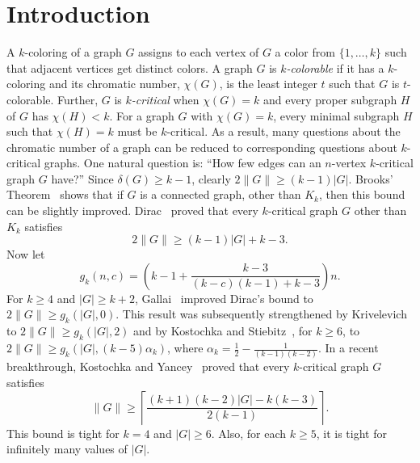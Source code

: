\documentclass[12pt]{article}
\theoremstyle{plain}
\theoremstyle{definition}
\theoremstyle{remark}
\newcommand{\ceil}[1]{\left\lceil#1\right\rceil}
\begin{document}
\section{Introduction}
A $k$-coloring of a graph $G$ assigns to each vertex of $G$ a color from
$\{1,\ldots,k\}$ such that adjacent vertices get distinct colors.  A graph $G$ is
\emph{$k$-colorable} if it has a $k$-coloring and its chromatic number,
$\chi(G)$, is the least integer $t$ such that $G$ is $t$-colorable.  
Further, $G$ is \emph{$k$-critical} when $\chi(G)=k$ and every proper subgraph
$H$ of $G$ has $\chi(H)<k$.  For a graph $G$ with $\chi(G)=k$, every minimal
subgraph $H$ such that $\chi(H)=k$ must be $k$-critical.  As a result, many
questions about the chromatic number of a graph can be reduced to corresponding
questions about $k$-critical graphs.  One natural question is: ``How few edges can
an $n$-vertex $k$-critical graph $G$ have?''  Since $\delta(G)\ge k-1$, clearly
$2\|G\| \ge (k-1)|G|$.  Brooks' Theorem~\cite{brooks1941coloring} shows that if
$G$ is a connected graph, other than $K_k$, then this bound can be slightly
improved.  Dirac~\cite{dirac1957theorem} proved that every $k$-critical graph
$G$ other than $K_k$ satisfies 
$$
2\|G\| \ge (k-1)|G|+k-3.
$$
Now let 
$$
g_k(n,c) = \left(k-1 + \frac{k-3}{(k-c)(k-1)+k-3}\right)n.
$$
For $k\ge 4$ and $|G|\ge k+2$, Gallai~\cite{gallai1963kritische} improved
Dirac's bound to $2\|G\| \ge g_k(|G|,0)$.  This result was subsequently
strengthened by Krivelevich~\cite{krivelevich1997minimal} to $2\|G\|\ge
g_k(|G|,2)$ and by Kostochka and
Stiebitz~\cite{kostochkastiebitzedgesincriticalgraph}, for $k\ge 6$, to $2\|G\|
\ge g_k(|G|,(k-5)\alpha_k)$, where $\alpha_k = \frac12-\frac1{(k-1)(k-2)}$.
In a recent breakthrough, Kostochka and Yancey~\cite{kostochkayancey2012ore}
proved that every $k$-critical graph $G$ satisfies
$$
\|G\| \ge \ceil{\frac{(k+1)(k-2)|G|-k(k-3)}{2(k-1)}}.
$$
This bound is tight for $k=4$ and $|G|\ge 6$.  Also, for each $k\ge 5$, it is tight
for infinitely many values of $|G|$.
\end{document}
